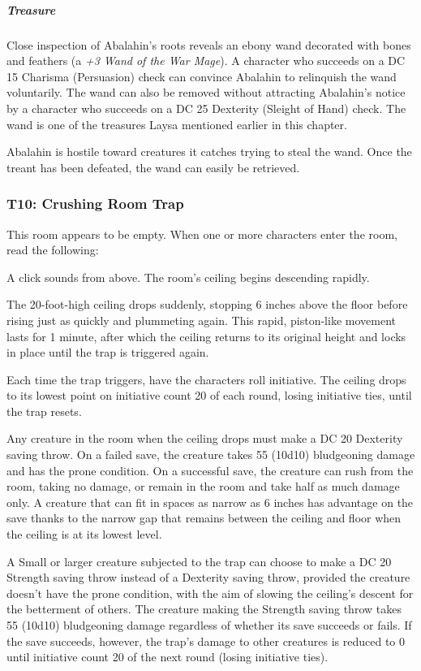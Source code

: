 \documentclass[10pt,a4paper,twoside,bg=print,twocolumn,openany,nodeprecatedcode]{dndbook}
\begin{document}
\subparagraph{Treasure}
Close inspection of Abalahin's roots reveals an ebony wand decorated with bones and feathers (a \textit{+3 Wand of the War Mage}). A character who succeeds on a DC 15 Charisma (Persuasion) check can convince Abalahin to relinquish the wand voluntarily. The wand can also be removed without attracting Abalahin's notice by a character who succeeds on a DC 25 Dexterity (Sleight of Hand) check. The wand is one of the treasures Laysa mentioned earlier in this chapter.

Abalahin is hostile toward creatures it catches trying to steal the wand. Once the treant has been defeated, the wand can easily be retrieved.

\subsubsection{T10: Crushing Room Trap}
This room appears to be empty. When one or more characters enter the room, read the following:

\begin{DndReadAloud}{}
A click sounds from above. The room's ceiling begins descending rapidly.

\end{DndReadAloud}

The 20-foot-high ceiling drops suddenly, stopping 6 inches above the floor before rising just as quickly and plummeting again. This rapid, piston-like movement lasts for 1 minute, after which the ceiling returns to its original height and locks in place until the trap is triggered again.

Each time the trap triggers, have the characters roll initiative. The ceiling drops to its lowest point on initiative count 20 of each round, losing initiative ties, until the trap resets.

Any creature in the room when the ceiling drops must make a DC 20 Dexterity saving throw. On a failed save, the creature takes 55 (10d10) bludgeoning damage and has the prone condition. On a successful save, the creature can rush from the room, taking no damage, or remain in the room and take half as much damage only. A creature that can fit in spaces as narrow as 6 inches has advantage on the save thanks to the narrow gap that remains between the ceiling and floor when the ceiling is at its lowest level.

A Small or larger creature subjected to the trap can choose to make a DC 20 Strength saving throw instead of a Dexterity saving throw, provided the creature doesn't have the prone condition, with the aim of slowing the ceiling's descent for the betterment of others. The creature making the Strength saving throw takes 55 (10d10) bludgeoning damage regardless of whether its save succeeds or fails. If the save succeeds, however, the trap's damage to other creatures is reduced to 0 until initiative count 20 of the next round (losing initiative ties).
\end{document}
